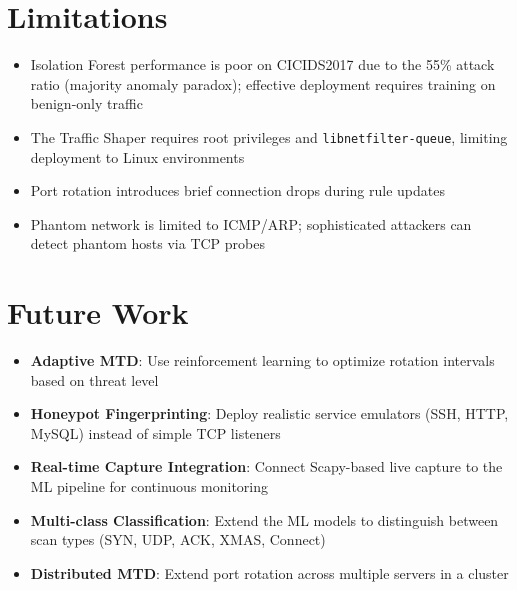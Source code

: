 \section{Limitations}

\begin{itemize}
    \item Isolation Forest performance is poor on CICIDS2017 due to the 55\% attack ratio (majority anomaly paradox); effective deployment requires training on benign-only traffic
    \item The Traffic Shaper requires root privileges and \texttt{libnetfilter-queue}, limiting deployment to Linux environments
    \item Port rotation introduces brief connection drops during rule updates
    \item Phantom network is limited to ICMP/ARP; sophisticated attackers can detect phantom hosts via TCP probes
\end{itemize}

\section{Future Work}

\begin{itemize}
    \item \textbf{Adaptive MTD}: Use reinforcement learning to optimize rotation intervals based on threat level
    \item \textbf{Honeypot Fingerprinting}: Deploy realistic service emulators (SSH, HTTP, MySQL) instead of simple TCP listeners
    \item \textbf{Real-time Capture Integration}: Connect Scapy-based live capture to the ML pipeline for continuous monitoring
    \item \textbf{Multi-class Classification}: Extend the ML models to distinguish between scan types (SYN, UDP, ACK, XMAS, Connect)
    \item \textbf{Distributed MTD}: Extend port rotation across multiple servers in a cluster
\end{itemize}
